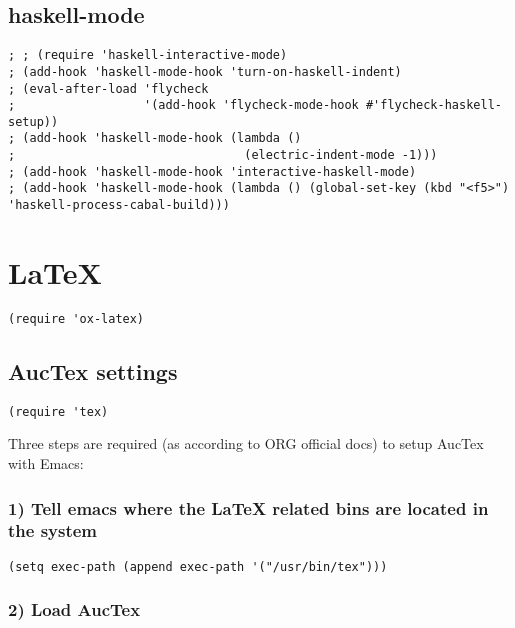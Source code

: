 \documentclass[11pt]{article}
\begin{document}
\subsection*{haskell-mode}
\label{sec:orgb41d897}
\begin{verbatim}
; ; (require 'haskell-interactive-mode)
; (add-hook 'haskell-mode-hook 'turn-on-haskell-indent)
; (eval-after-load 'flycheck
;                  '(add-hook 'flycheck-mode-hook #'flycheck-haskell-setup))
; (add-hook 'haskell-mode-hook (lambda ()
;                                (electric-indent-mode -1)))
; (add-hook 'haskell-mode-hook 'interactive-haskell-mode)
; (add-hook 'haskell-mode-hook (lambda () (global-set-key (kbd "<f5>") 'haskell-process-cabal-build)))
\end{verbatim}




\section*{\LaTeX{}}
\label{sec:org27321ec}

\begin{verbatim}
(require 'ox-latex)
\end{verbatim}

\subsection*{AucTex settings}
\label{sec:org677565c}

\begin{verbatim}
(require 'tex)
\end{verbatim}

Three steps are required (as according to ORG official docs) to setup AucTex with Emacs:

\subsubsection*{1) Tell emacs where the \LaTeX{} related bins are located in the system}
\label{sec:orgd127ecf}

\begin{verbatim}
(setq exec-path (append exec-path '("/usr/bin/tex")))
\end{verbatim}

\subsubsection*{2) Load AucTex}
\label{sec:orgee19d69}
\end{document}
